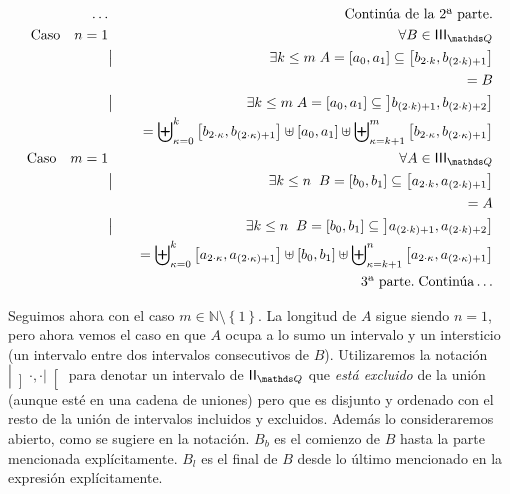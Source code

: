 \documentclass[final,12pt,a4paper,twoside,fleqn]{extbook}
\newcommand{\set}[1]{\ensuremath{\left\lbrace{#1}\right\rbrace}}
\newcommand{\setN}{\ensuremath{\mathds{N}}}
\theoremstyle{definition}
\theoremstyle{remark}
\begin{document}
\begin{eqnarray}
\nonumber
\ldots&&\text{Continúa de la 2ª parte.}\\ \nonumber
\text{Caso}\quad n = 1 &\quad& \forall B \in \IIIQ \\ 
&\big{|}&\exists k \leq m \;A = \left[a_0,a_1\right] \subseteq \left[b_{2
\cdot k},b_{(2 \cdot k)+1}\right] \\
&\phantom{\big{|}}&\; = B\\
&\big{|}&\exists k \leq m \;A = \left[a_0,a_1\right] \subseteq \left]b_{(2
\cdot k)+1},b_{(2 \cdot k)+2}\right]\\
&\phantom{\big{|}}&\; = {\biguplus}_{\kappa=0}^{k} \left[b_{2 \cdot
\kappa},b_{(2 \cdot \kappa)+1}\right] \uplus \left[a_0,a_1\right] \uplus
{\biguplus}_{\kappa=k+1}^{m} \left[b_{2 \cdot \kappa},b_{(2 \cdot
\kappa)+1}\right]\\ \nonumber
\text{Caso}\quad m = 1 &\quad& \forall A \in \IIIQ \\ 
&\big{|}&\exists k \leq n \;\; B = \left[b_0,b_1\right] \subseteq \left[a_{2
\cdot k},a_{(2 \cdot k)+1}\right] \\
&\phantom{\big{|}}&\; = A\\
&\big{|}&\exists k \leq n \;\;  B = \left[b_0,b_1\right] \subseteq
\left]a_{(2 \cdot k)+1},a_{(2 \cdot k)+2}\right] \\
&\phantom{\big{|}}&\; = {\biguplus}_{\kappa=0}^{k} \left[a_{2 \cdot
\kappa},a_{(2 \cdot \kappa)+1}\right] \uplus \left[b_0,b_1\right] \uplus
{\biguplus}_{\kappa=k+1}^{n} \left[a_{2 \cdot \kappa},a_{(2 \cdot
\kappa)+1}\right]\\ \nonumber
&&\text{3ª parte.}\;\text{Continúa}\ldots
\end{eqnarray}



	Seguimos ahora con el caso \(m \in \setN\setminus\set{1}\). La longitud
de \(A\) sigue siendo \(n=1\), pero ahora vemos el caso en que \(A\) ocupa a
lo sumo un intervalo y un intersticio (un intervalo entre dos intervalos
consecutivos de \(B\)). Utilizaremos la notación \( \left| \left] \cdot ,
\cdot \right| \right[ \) para denotar un intervalo de \(\IIQ\) que \emph{está
excluido} de la unión (aunque esté en una cadena de uniones) pero que es
disjunto y ordenado con el resto de la unión de intervalos incluidos y
excluidos. Además lo consideraremos abierto, como se sugiere en la notación.
\(B_b\) es el comienzo de \(B\) hasta la parte mencionada explícitamente.
\(B_l\) es el final de \(B\) desde lo último mencionado en la expresión
explícitamente.
\end{document}
